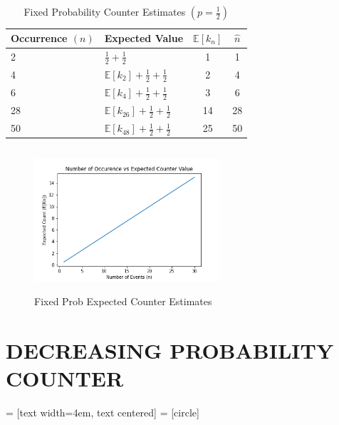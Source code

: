 \documentclass[longpaper, english, final, times]{revdetua}
\begin{document}
		\begin{table}[!ht!]
			\begin{center}
				\label{table:fixedProbCounterExpectedEstimate}
				\caption{Fixed Probability Counter Estimates $\left(p=\frac{1}{2}\right)$}	
				{\def\arraystretch{2}%
					\begin{tabular}{l|l|c|c}
						\toprule
						Occurrence $(n)$ & Expected Value& $\mathbb{E}[k_n]$ & $\widehat{n}$\\
						\hline
						2&$\frac{1}{2}+\frac{1}{2}$&1&1\\
						4&$\mathbb{E}[k_{2}]+\frac{1}{2}+\frac{1}{2}$&2&4\\
						6& $\mathbb{E}[k_{4}]+\frac{1}{2}+\frac{1}{2}$&3&6\\
						28 & $\mathbb{E}[k_{26}]+\frac{1}{2}+\frac{1}{2}$&14&28\\
						50 & $\mathbb{E}[k_{48}]+\frac{1}{2}+\frac{1}{2}$&25&50\\
						\bottomrule
					\end{tabular}
				}
			\end{center}
		\end{table}
	
		\begin{figure}[ht!]
			\centering
			\caption{Fixed Prob Expected Counter Estimates}
			\includegraphics[width=260px, height=200px]{imgs/fixed.png}		
		\end{figure}	
	
	\section{DECREASING PROBABILITY COUNTER}
	
		 = [text width=4em, text centered]
		 = [circle]
		
\end{document}
